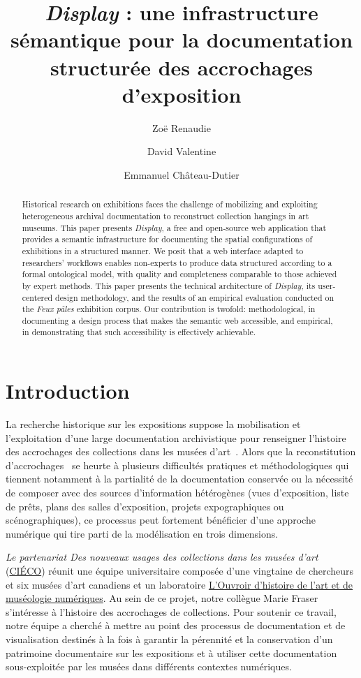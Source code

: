 \documentclass[fra, final]{anthology-ch}         %
\title{\textit{Display} : une infrastructure sémantique pour la documentation structurée des accrochages d’exposition}
\author[1]{Zoë Renaudie}[
  orcid=0009-0001-5825-8624,
  email=zoe.renaudie@umontreal.ca
]
\author[1]{David Valentine}[
  orcid=0000-0003-3410-7677,
  email=david.valentine@umontreal.ca
]
\author[1]{Emmanuel Château-Dutier}[
  orcid=0000-0003-4092-4569,
  email=emmanuel.chateau.dutier@umontreal.ca
]
\affiliation{1}{Université de Montréal, Québec, Canada}
\begin{document}
\maketitle

\begin{abstract}
Historical research on exhibitions faces the challenge of mobilizing and exploiting heterogeneous archival documentation to reconstruct collection hangings in art museums. This paper presents \textit{Display}, a free and open-source web application that provides a semantic infrastructure for documenting the spatial configurations of exhibitions in a structured manner. We posit that a web interface adapted to researchers' workflows enables non-experts to produce data structured according to a formal ontological model, with quality and completeness comparable to those achieved by expert methods. This paper presents the technical architecture of \textit{Display}, its user-centered design methodology, and the results of an empirical evaluation conducted on the \textit{Feux pâles} exhibition corpus. Our contribution is twofold: methodological, in documenting a design process that makes the semantic web accessible, and empirical, in demonstrating that such accessibility is effectively achievable.
\end{abstract}

\section{Introduction} 

La recherche historique sur les expositions suppose la mobilisation et l’exploitation d’une large documentation archivistique pour renseigner l’histoire des accrochages des collections dans les musées d’art~\cite{merminod2012exposition}. Alors que la reconstitution d’accrochages~\cite{davallon2011pouvoir} se heurte à plusieurs difficultés pratiques et méthodologiques qui tiennent notamment à la partialité de la documentation conservée ou la nécessité de composer avec des sources d’information hétérogènes (vues d’exposition, liste de prêts, plans des salles d’exposition, projets expographiques ou scénographiques), ce processus peut fortement bénéficier d’une approche numérique qui tire parti de la modélisation en trois dimensions.

\textit{Le partenariat Des nouveaux usages des collections dans les musées d’art }(\href{https://www.cieco.co}{CIÉCO}) réunit une équipe universitaire composée d’une vingtaine de chercheurs et six musées d’art canadiens et un laboratoire \href{https://ouvoir.umontreal.ca}{L’Ouvroir d’histoire de l’art et de muséologie numériques}. Au sein de ce projet, notre collègue Marie Fraser s’intéresse à l’histoire des accrochages de collections. Pour soutenir ce travail, notre équipe a cherché à mettre au point des processus de documentation et de visualisation destinés à la fois à garantir la pérennité et la conservation d’un patrimoine documentaire sur les expositions et à utiliser cette documentation sous-exploitée par les musées dans différents contextes numériques.  
\end{document}
